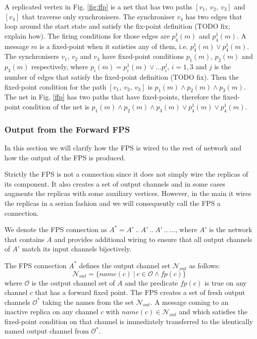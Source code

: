 A replicated vertex in Fig. \ref{fig:ffp} is a net that has two paths $[v_1, \: v_2, \: v_3]$ and $[v_4]$ that traverse only synchronisers. The synchroniser $v_4$ has two edges that loop around the start state and satisfy the fix-point definition (TODO fix; explain how). The firing conditions for those edges are $p^{1}_4(m)$ and $p^{1}_4(m)$. A message $m$ is a fixed-point when it satisties any of them, i.e. $p^{1}_4(m) \lor p^{1}_4(m)$. The synchronisers $v_1$, $v_2$ and $v_3$ have fixed-point conditions $p_1(m)$, $p_2(m)$ and $p_3(m)$ respectively, where $p_i(m) = p^{1}_i(m) \lor \dots p^{j}_i$, $i=1,3$ and $j$ is the number of edges that satisfy the fixed-point definition (TODO fix). Then the fixed-point condition for the path $[v_1, \: v_2, \: v_3]$ is $p_1(m) \land p_2(m) \land p_3(m)$. The net in Fig. \ref{ffp} has two paths that have fixed-points, therefore the fixed-point condition of the net is $p_1(m) \land p_2(m) \land p_3(m) \lor p^{1}_4(m) \lor p^{1}_4(m)$.






    \subsubsection{Output from the Forward FPS}
In this section we will clarify how the FPS is wired to the rest of network and how the output of the FPS is produced.

Strictly the FPS is not a connection since it does not simply wire the replicas of its component. It also creates a set of output channels and in some cases augments the replicas with some auxiliary vertices. However, in the main it wires the replicas in a serian fashion and we will consequently call the FPS a connection.

We denote the FPS connection as $A^{*} = A' \: .. \: A' \: .. \: A' \: .. \: \dots$, where $A'$ is the network that contains $A$ and provides additional wiring to ensure that all output channels of $A'$ match its input channels bijectively.

The FPS connection $A^{*}$ defines the output channel set $\mathcal{N}_{out}$ as follows:
\begin{equation}
\mathcal{N}_{out} = \{ name(c) \: | \: c \in \mathcal{O} \land fp(c) \}\nonumber
\end{equation}
where $\mathcal{O}$ is the output channel set of $A$ and the predicate $fp(c)$ is true on any channel $c$ that has a forward fixed point. The FPS creates a set of fresh output channels $\mathcal{O}^{*}$ taking the names from the set $\mathcal{N}_{out}$. A message coming to an inactive replica on any channel $c$ with $name(c) \in \mathcal{N}_{out}$ and which satisfies the fixed-point condition on that channel is immediately transferred to the identically named output channel from $\mathcal{O}^{*}$.

